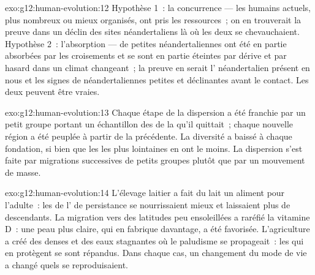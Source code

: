 \begin{solution}{exo:g12:human-evolution:12}
Hypothèse 1~: la concurrence --- les humains actuels, plus nombreux ou
mieux organisés, ont pris les ressources~; on en trouverait la preuve
dans un déclin des sites néandertaliens là où les deux se
chevauchaient. Hypothèse 2~: l'absorption --- de petites 
néandertaliennes ont été en partie absorbées par les croisements et se
sont en partie éteintes par dérive et par hasard dans un climat
changeant~; la preuve en serait l' néandertalien présent en nous et
les signes de  néandertaliennes petites et déclinantes
avant le contact. Les deux peuvent être vraies.
\end{solution}

\begin{solution}{exo:g12:human-evolution:13}
Chaque étape de la dispersion a été franchie par un petit groupe
portant un échantillon des  de la  qu'il quittait~;
chaque nouvelle région a été peuplée à partir de la précédente. La
diversité a baissé à chaque fondation, si bien que les  les
plus lointaines en ont le moins. La dispersion s'est faite par
migrations successives de petits groupes plutôt que par un mouvement
de masse.
\end{solution}

\begin{solution}{exo:g12:human-evolution:14}
L'élevage laitier a fait du lait un aliment pour l'adulte~: les
 de l' de persistance se nourrissaient mieux et
laissaient plus de descendants. La migration vers des latitudes peu
ensoleillées a raréfié la vitamine D~: une peau plus claire, qui en
fabrique davantage, a été favorisée. L'agriculture a créé des
 denses et des eaux stagnantes où le paludisme se
propageait~: les  qui en protègent se sont répandus. Dans
chaque cas, un changement du mode de vie a changé quels  se
reproduisaient.
\end{solution}

